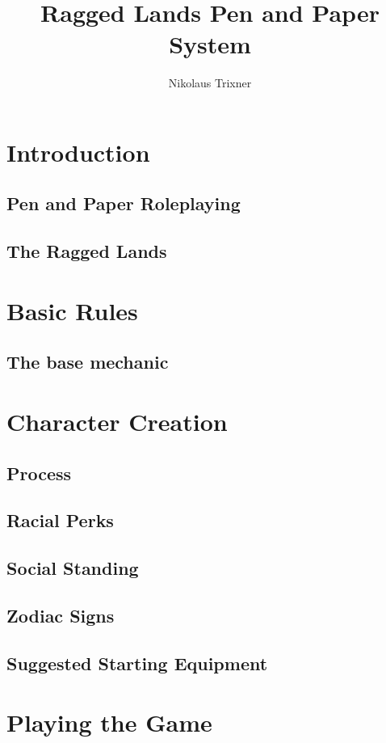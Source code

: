 \documentclass{book}
\begin{document}
	
	\title{Ragged Lands Pen and Paper System}
	\author{Nikolaus Trixner}
	
	\maketitle
	\tableofcontents
\part{Introduction}
\chapter{Pen and Paper Roleplaying}
\chapter{The Ragged Lands}

\part{Basic Rules}
\chapter{The base mechanic}

\part{Character Creation}
\chapter{Process}
\chapter{Racial Perks}
\chapter{Social Standing}
\chapter{Zodiac Signs}
\chapter{Suggested Starting Equipment}

\part{Playing the Game}
\end{document}
